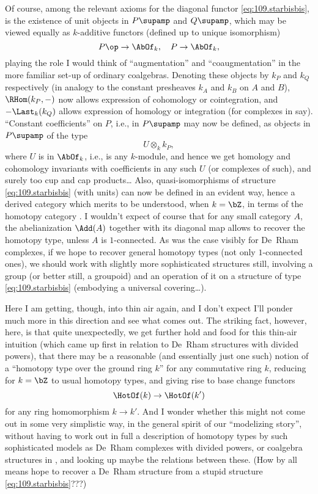 \begin{remarks}
  Of course, among the relevant axioms for the diagonal functor
  \eqref{eq:109.starbisbis}, is the existence of unit objects in
  $P\supamp$ and $Q\supamp$, which may be viewed equally as
  $k$-additive functors (defined up to unique isomorphism)
  \[P\op\to\AbOf_k, \quad P\to\AbOf_k,\]
  playing the role I would think of ``augmentation'' and
  ``coaugmentation'' in the more familiar set-up of ordinary
  coalgebras. Denoting these objects by $k_P$ and $k_Q$ respectively
  (in analogy to the constant presheaves $k_A$ and $k_B$ on $A$ and
  $B$), $\RHom(k_P,{-})$ now allows expression of cohomology or
  cointegration, and ${-}\Last_k(k_Q)$ allows expression of homology
  or integration (for complexes in \PampM{} say). ``Constant
  coefficients'' on $P$, i.e., in $P\supamp$ may now be defined, as
  objects in $P\supamp$ of the type
  \[U\otimes_k k_P,\]
  where $U$ is in $\AbOf_k$, i.e., is any $k$-module, and hence we get
  homology and cohomology invariants with coefficients in any such $U$
  (or complexes of such), and surely too cup and cap products\ldots
  Also, quasi-isomorphisms of structure \eqref{eq:109.starbisbis}
  (with units) can now be defined in an evident way, hence a derived
  category which merits to be understood, when $k=\bZ$, in terms of
  the homotopy category \Hot. I wouldn't expect of course that for any
  small category $A$, the abelianization $\Add(A)$ together with its
  diagonal map allows to recover the homotopy type, unless $A$ is
  $1$-connected. As was the case visibly for De~Rham complexes, if we
  hope to recover general homotopy types (not only $1$-connected
  ones), we should work with slightly more sophisticated structures
  still, involving a group (or better still, a groupoid)
  and an operation of it on a structure of type
  \eqref{eq:109.starbisbis} (embodying a universal covering\ldots).

  Here I am getting, though, into thin air again, and I don't expect
  I'll ponder much more in this direction and see what comes out. The
  striking fact, however, here, is that quite unexpectedly, we get
  further hold and food for this thin-air intuition (which came up
  first in relation to De~Rham structures with divided powers), that
  there may be a reasonable (and essentially just one such) notion of
  a ``homotopy type over the ground ring $k$'' for any commutative
  ring $k$, reducing for $k=\bZ$ to usual homotopy types, and giving
  rise to base change functors
  \[\HotOf(k)\to\HotOf(k')\]
  for any ring homomorphism $k\to k'$. And I wonder whether this might
  not come out in some very simplistic way, in the general spirit of
  our ``modelizing story'', without having to work out in full a
  description of homotopy types by such sophisticated models as
  De~Rham complexes with divided powers, or coalgebra structures in
  \Cat, and looking up maybe the relations between these. (How by all
  means hope to recover a De~Rham structure from a stupid structure
  \eqref{eq:109.starbisbis}???)
  

\end{remarks}
